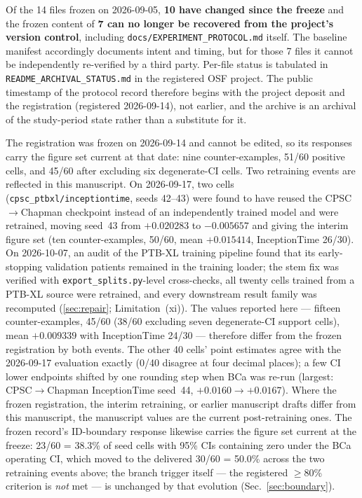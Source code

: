 \documentclass[review,12pt,nonatbib]{elsarticle}
\begin{document}
Of the 14 files frozen on 2026-09-05, \textbf{10 have changed since the
freeze} and the frozen content of \textbf{7 can no longer be recovered from
the project's version control}, including \texttt{docs/EXPERIMENT\_PROTOCOL.md}
itself. The baseline manifest accordingly documents intent and timing, but
for those 7 files it cannot be independently re-verified by a third party.
Per-file status is tabulated in \texttt{README\_ARCHIVAL\_STATUS.md} in the
registered OSF project. The public timestamp of the protocol record
therefore begins with the project deposit and the registration
(registered 2026-09-14), not earlier, and the archive is an archival of the
study-period state rather than a substitute for it.

The registration was frozen on 2026-09-14 and cannot be edited, so its
responses carry the figure set current at that date: nine counter-examples,
51/60 positive cells, and 45/60 after excluding six degenerate-CI cells.
Two retraining events are reflected in this manuscript. On 2026-09-17, two
cells (\texttt{cpsc\_ptbxl/inceptiontime}, seeds 42--43) were found to have
reused the CPSC$\rightarrow$Chapman checkpoint instead of an independently
trained model and were retrained, moving seed~43 from $+0.020283$ to
$-0.005657$ and giving the interim figure set (ten counter-examples, 50/60,
mean $+0.015414$, InceptionTime 26/30). On 2026-10-07, an audit of the
PTB-XL training pipeline found that its early-stopping validation patients
remained in the training loader; the stem fix was verified with
\texttt{export\_splits.py}-level cross-checks, all twenty cells trained
from a PTB-XL source were retrained, and every downstream result family
was recomputed (\ref{sec:repair}; Limitation~(xi)). The
values reported here --- fifteen counter-examples, 45/60 (38/60 excluding
seven degenerate-CI support cells), mean $+0.009339$ with InceptionTime
24/30 --- therefore differ from the frozen registration by both events.
The other 40 cells' point estimates agree with the 2026-09-17 evaluation
exactly (0/40 disagree at four decimal places); a few CI lower endpoints
shifted by one rounding step when BCa was re-run (largest:
CPSC$\rightarrow$Chapman InceptionTime seed~44, $+0.0160\rightarrow+0.0167$).
Where the frozen registration, the interim retraining, or earlier
manuscript drafts differ from this manuscript, the manuscript values are
the current post-retraining ones. The frozen record's ID-boundary
response likewise carries the figure set current at the freeze:
23/60 = 38.3\% of seed cells with 95\% CIs containing zero under the
BCa operating CI, which moved to the delivered 30/60 = 50.0\% across
the two retraining events above; the branch trigger itself --- the
registered $\geq$80\% criterion is \emph{not} met --- is unchanged by
that evolution (Sec.~\ref{sec:boundary}).
\end{document}

